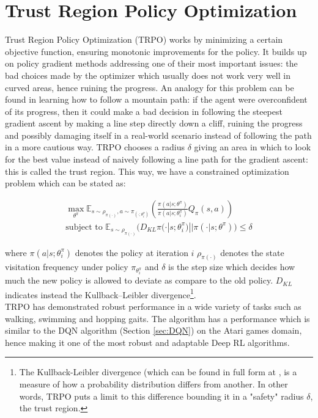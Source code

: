 \section{Trust Region Policy Optimization}
Trust Region Policy Optimization (TRPO)\cite{schulman2015trust} works by minimizing a certain objective function, ensuring monotonic improvements for the policy. It builds up on policy gradient methods addressing one of their most important issues: the bad choices made by the optimizer which usually does not work very well in curved areas, hence ruining the progress. An analogy for this problem can be found in learning how to follow a mountain path: if the agent were overconfident of its progress, then it could make a bad decision in following the steepest gradient ascent by making a line step directly down a cliff, ruining the progress and possibly damaging itself in a real-world scenario instead of following the path in a more cautious way. TRPO chooses a radius $\delta$ giving an area in which to look for the best value instead of naively following a line path for the gradient ascent: this is called the trust region. This way, we have a constrained optimization problem which can be stated as:


\begin{equation}
\label{eq:TRPO}
	\begin{aligned}
		\max_{\theta^\pi}\mathbb{E}_{s\sim\rho_{\pi(\cdot)}, a\sim\pi_{(\cdot;\theta^\pi_i)}} \left( \frac{\pi(a|s; \theta^\pi)}{\pi(a|s; \theta^\pi_i)}Q_\pi(s,a) \right) \\
		\text{subject to $\mathbb{E}_{s \sim \rho_{\pi(\cdot)}}$} \big(D_{KL}		\pi(\cdot|s;\theta^\pi_i)||\pi(\cdot|s;\theta^\pi)\big) \leq  \delta 
	\end{aligned}
\end{equation}


where $\pi(a|s; \theta^\pi_i)$ denotes the policy at iteration $i$ $\rho_{\pi(\cdot)}$ denotes the state visitation frequency under policy $\pi_{\theta^\pi_i}$ and $\delta$ is the step size which decides how much the new policy is allowed to deviate as compare to the old policy. $D_{KL}$ indicates instead the Kullback–Leibler divergence\footnote{The Kullback-Leibler divergence (which can be found in full form at \cite{hershey2007approximating}, is a measure of how a probability distribution differs from another. In other words, TRPO puts a limit to this difference bounding it in a "safety" radius $\delta$, the trust region. }.
\\
\indent TRPO has demonstrated robust performance in a wide variety of tasks such as walking, swimming and hopping gaits. The algorithm has a performance which is similar to the DQN algorithm (Section \ref{sec:DQN}) on the Atari games domain, hence making it one of the most robust and adaptable Deep RL algorithms.

